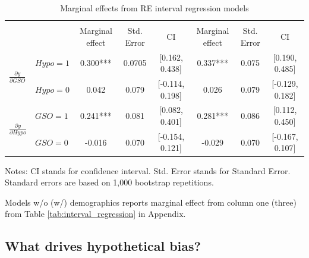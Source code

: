 \documentclass[12pt]{article}
\begin{document}
\begin{table}[htbp]
\centering
\footnotesize
\caption{Marginal effects from RE interval regression models}
\label{tab: Regression}
\begin{tabular}{llcccccc}
\toprule
 & &  &  \\
 & & Marginal effect & Std. Error& CI & Marginal effect & Std. Error&CI \\ \midrule
{} & $Hypo=1$ &0.300*** &0.0705& [0.162, 0.438] &0.337***&0.075 & [0.190, 0.485]\\
                                              & $Hypo=0$ &0.042 &0.079& [-0.114, 0.198] &0.026&0.079 & [-0.129, 0.182]\\ \midrule

                                              
 & $GSO=1$ &0.241***  & 0.081&[0.082, 0.401]&0.281*** & 0.086&[0.112, 0.450]\\
                                                & $GSO=0$ &-0.016 &0.070 &[-0.154, 0.121]&-0.029 &0.070&[-0.167, 0.107] \\ \bottomrule


\end{tabular}
\begin{tablenotes}
\footnotesize

\item Notes: CI stands for confidence interval. Std. Error stands for Standard Error. Standard errors are based on 1,000 bootstrap repetitions.
\item Models w/o (w/) demographics reports marginal effect from column one (three) from Table \ref{tab:interval_regression} in Appendix.
\end{tablenotes}
\end{table}


            
\subsection{What drives hypothetical bias?} \label{sec: Driver of HB}
\end{document}
